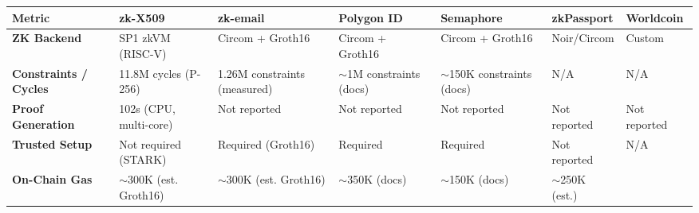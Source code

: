 \documentclass[11pt, a4paper]{article}
\begin{document}
\begin{longtable}[]{@{}
  >{\raggedright\arraybackslash}p{}
  >{\raggedright\arraybackslash}p{}
  >{\raggedright\arraybackslash}p{}
  >{\raggedright\arraybackslash}p{}
  >{\raggedright\arraybackslash}p{}
  >{\raggedright\arraybackslash}p{}
  >{\raggedright\arraybackslash}p{}@{}}
\toprule\noalign{}
\begin{minipage}[b]{\linewidth}\raggedright
Metric
\end{minipage} & \begin{minipage}[b]{\linewidth}\raggedright
zk-X509
\end{minipage} & \begin{minipage}[b]{\linewidth}\raggedright
zk-email
\end{minipage} & \begin{minipage}[b]{\linewidth}\raggedright
Polygon ID
\end{minipage} & \begin{minipage}[b]{\linewidth}\raggedright
Semaphore
\end{minipage} & \begin{minipage}[b]{\linewidth}\raggedright
zkPassport
\end{minipage} & \begin{minipage}[b]{\linewidth}\raggedright
Worldcoin
\end{minipage} \\
\midrule\noalign{}
\endhead
\bottomrule\noalign{}
\endlastfoot
\textbf{ZK Backend} & SP1 zkVM (RISC-V) & Circom + Groth16 & Circom +
Groth16 & Circom + Groth16 & Noir/Circom & Custom \\
\textbf{Constraints / Cycles} & 11.8M cycles (P-256) & 1.26M constraints
(measured) & $\sim$1M constraints (docs) & $\sim$150K
constraints (docs) & N/A & N/A \\
\textbf{Proof Generation} & 102s (CPU, multi-core) & Not reported & Not reported & Not reported &
Not reported & Not reported \\
\textbf{Trusted Setup} & Not required (STARK) & Required (Groth16) &
Required & Required & Not reported & N/A \\
\textbf{On-Chain Gas} & $\sim$300K (est. Groth16) &
$\sim$300K (est. Groth16) & $\sim$350K (docs) &
$\sim$150K (docs) & $\sim$250K (est.) &

\end{longtable}
\end{document}
